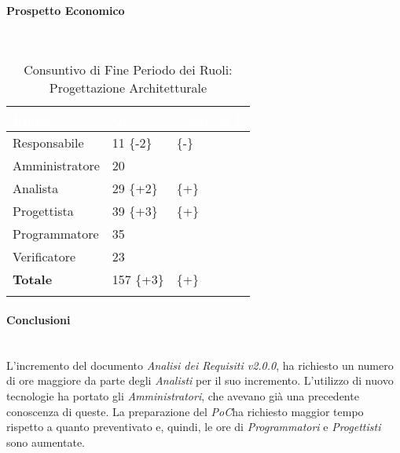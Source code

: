 \paragraph{Prospetto Economico} ~\\

\begin{longtable}{| C{.30\textwidth}| C{.15\textwidth}| C{.20\textwidth}|}
\hline
{}\textbf{\textcolor{white}{Ruolo}} & \textbf{\textcolor{white}{Ore}} & \textbf{\textcolor{white}{Costo in \euro}} \\
\hline 
Responsabile & 11 \{-2\}&  \{-\} \\
\hline
{}Amministratore & 20 &  \\
\hline
Analista & 29 \{+2\} &  \{+\}\\
\hline
{}Progettista & 39 \{+3\} &  \{+\}\\
\hline
Programmatore & 35 &  \\
\hline
{}Verificatore & 23 & \\
\hline
\textbf{Totale} & 157 \{+3\} &  \{+\}\\ 
\hline

\caption{Consuntivo di Fine Periodo dei Ruoli: Progettazione Architetturale}
\label{Distribuzione oraria per ruoli del periodo di pa}
\end{longtable}

\paragraph{Conclusioni} ~\\
L'incremento del documento \textit{Analisi dei Requisiti v2.0.0}, ha richiesto un numero di ore maggiore da parte degli \textit{Analisti} per il suo incremento. L'utilizzo di nuovo tecnologie ha portato gli \textit{Amministratori}, che avevano già una precedente conoscenza di queste. La preparazione del \textit{PoC}\glossario ha richiesto maggior tempo rispetto a quanto preventivato e, quindi, le ore di \textit{Programmatori} e \textit{Progettisti} sono aumentate. 

\pagebreak



